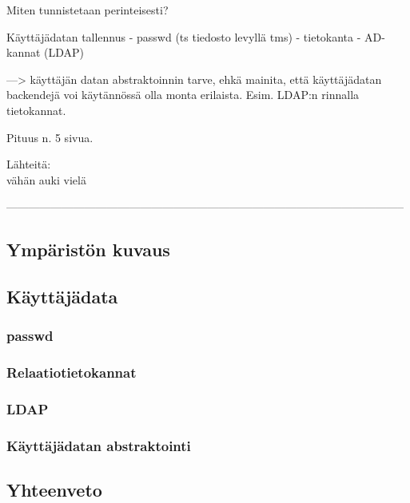 Miten tunnistetaan perinteisesti?

Käyttäjädatan tallennus
- passwd (ts tiedosto levyllä tms)
- tietokanta
- AD-kannat (LDAP)

---> käyttäjän datan abstraktoinnin tarve, ehkä mainita, että käyttäjädatan backendejä voi käytännössä olla monta erilaista. Esim. LDAP:n rinnalla tietokannat.

Pituus n. 5 sivua.

Lähteitä:\\
vähän auki vielä

-----------------------------------------------------------------------------------------------------------


\subsection{Ympäristön kuvaus}

\subsection{Käyttäjädata}

\subsubsection{passwd}

\subsubsection{Relaatiotietokannat}

\subsubsection{LDAP}

\subsubsection{Käyttäjädatan abstraktointi}

\subsection{Yhteenveto}

